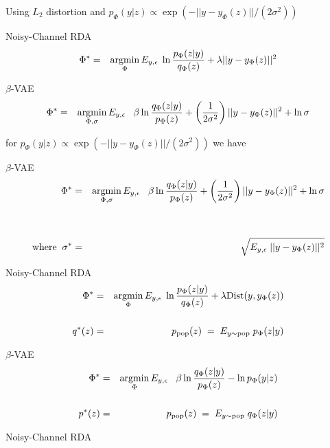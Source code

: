 {

Using $L_2$ distortion and $p_\Phi(y|z) \propto \exp(-||y - y_\Phi(z)||/(2\sigma^2))$

\vfill
Noisy-Channel RDA
\begin{eqnarray*}
\Phi^* & = & \operatorname*{argmin}_\Phi E_{y,\epsilon}\;\ln \frac{p_\Phi(z|y)}{q_\Phi(z)} + \lambda ||y - y_\Phi(z)||^2
\end{eqnarray*}

\vfill
$\beta$-VAE
\begin{eqnarray*}
\Phi^* & = & \operatorname*{argmin}_{\Phi,\sigma} E_{y,\epsilon}\;\;\;\beta \ln \frac{q_\Phi(z|y)}{p_\Phi(z)} +\left(\frac{1}{2\sigma^2}\right)||y - y_\Phi(z)||^2 + \ln \sigma
\end{eqnarray*}


for $p_\Phi(y|z) \propto \exp(-||y - y_\Phi(z)||/(2\sigma^2))$ we have

\vfill
$\beta$-VAE
\begin{eqnarray*}
\Phi^* & = & \operatorname*{argmin}_{\Phi,\sigma} E_{y,\epsilon}\;\;\;\beta \ln \frac{q_\Phi(z|y)}{p_\Phi(z)} +\left(\frac{1}{2\sigma^2}\right)||y - y_\Phi(z)||^2 + \ln \sigma \\
\\
\\
\mbox{where}\;\;\sigma^* & = & \sqrt{E_{y,\epsilon}\; ||y - y_\Phi(z)||^2}
\end{eqnarray*}



Noisy-Channel RDA
\begin{eqnarray*}
\Phi^* & = & \operatorname*{argmin}_\Phi E_{y,\epsilon}\;\ln \frac{p_\Phi(z|y)}{q_\Phi(z)} + \lambda \mathrm{Dist}(y, y_\Phi(z)) \\
\\
q^*(z) & = & p_{\mathrm{pop}}(z) \;=\;E_{y \sim \mathrm{pop}}\;p_\Phi(z|y)
\end{eqnarray*}

\vfill
$\beta$-VAE
\begin{eqnarray*}
\Phi^* & = & \operatorname*{argmin}_\Phi E_{y,\epsilon}\;\;\;\beta \ln \frac{q_\Phi(z|y)}{p_\Phi(z)} - \ln p_\Phi(y|z) \\
\\
p^*(z) & = & p_{\mathrm{pop}}(z) \;=\; E_{y \sim \mathrm{pop}}\;q_\Phi(z|y)
\end{eqnarray*}


Noisy-Channel RDA

}
